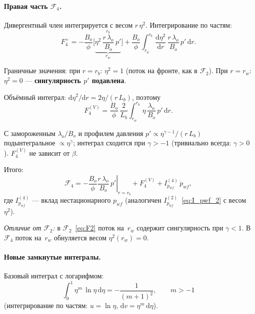 \documentclass[12pt,a4paper]{article}
\newcommand{\dd}{\mathrm{d}}
\begin{document}
\paragraph{Правая часть $\mathcal{F}_4$.}
Дивергентный член интегрируется с весом $r\,\eta^2$.
Интегрирование по частям:
\begin{equation}\label{eq:F4_boundary}
  F_4^\div
  = -\frac{B_o}{\phi}
    \biggl[
      \underbrace{\eta^2\,
        \frac{r\,\lambda_o}{B_o}\,p'}_{r_w}^{r_b}
    \biggr]
  + \frac{B_o}{\phi}
    \int_{r_w}^{r_b}
    \frac{\dd\eta^2}{\dd r}\,
    \frac{r\,\lambda_o}{B_o}\,p'\,\dd r.
\end{equation}

Граничные значения: при $r = r_b$: $\eta^2 = 1$
(поток на фронте, как в $\mathcal{F}_2$).
При $r = r_w$: $\eta^2 = 0$
--- \textbf{сингулярность $p'$ подавлена}.

Объёмный интеграл: $\dd\eta^2/\dd r
= 2\eta/(r\,L_b)$, поэтому
\begin{equation}\label{eq:F4_volume}
  F_4^{(V)}
  = \frac{B_o}{\phi}\,\frac{2}{L_b}
    \int_{r_w}^{r_b}
    \eta\,
    \frac{\lambda_o}{B_o}\,p'\,\dd r.
\end{equation}

С замороженным $\lambda_o/B_o$ и профилем
давления $p' \propto \eta^{\gamma-1}/(r\,L_b)$
подынтегральное $\propto \eta^{\gamma}$;
интеграл сходится при $\gamma > -1$
(тривиально всегда: $\gamma > 0$).
$F_4^{(V)}$ не зависит от $\beta$.

Итого:
\begin{equation}\label{eq:F4}
  \boxed{
    \mathcal{F}_4
    = -\frac{B_o}{\phi}
      \left.\frac{r\,\lambda_o}{B_o}\,p'
      \right|_{r=r_b}
    + F_4^{(V)}
    + I_{p_{wf}}^{(4)}\,\dot{p}_{wf},
  }
\end{equation}
где $I_{p_{wf}}^{(4)}$ --- вклад нестационарного $p_{wf}$
(аналогичен $I_{p_{wf}}^{(2)}$~\eqref{eq:I_pwf_2}
с весом $\eta^2$).

\emph{Отличие от $\mathcal{F}_2$:}
в $\mathcal{F}_2$~\eqref{eq:F2} поток на~$r_w$
содержит сингулярность при $\gamma < 1$.
В $\mathcal{F}_4$ поток на~$r_w$ обнуляется
весом $\eta^2(r_w) = 0$.

\paragraph{Новые замкнутые интегралы.}
Базовый интеграл с логарифмом:
\begin{equation}\label{eq:K_base}
  \int_0^1 \eta^m\,\ln\eta\,\dd\eta = -\frac{1}{(m{+}1)^2},
  \qquad m > -1
\end{equation}
(интегрирование по частям: $u = \ln\eta$,
$\dd v = \eta^m\,\dd\eta$).
\end{document}
